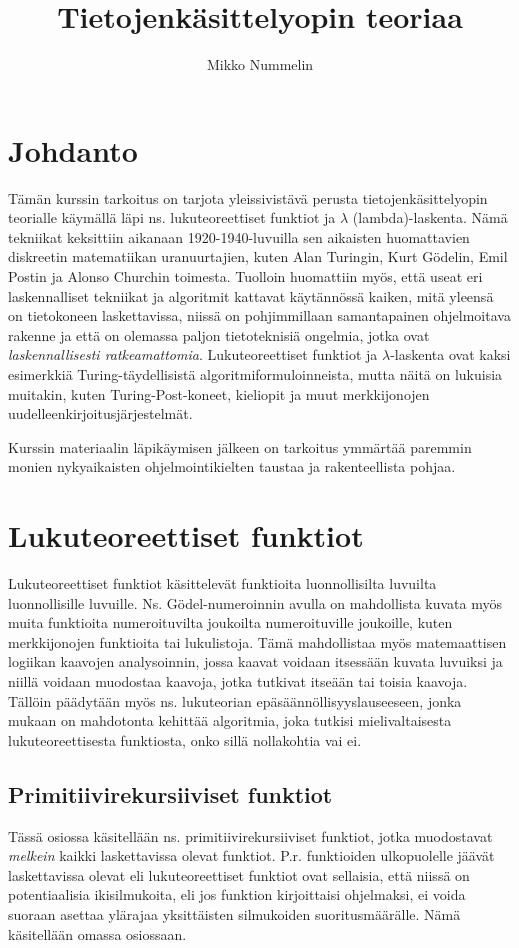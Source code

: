 \documentclass[a4paper]{article}
\begin{document}
\title{Tietojenkäsittelyopin teoriaa}
\author{Mikko Nummelin}
\maketitle
\tableofcontents

\section{Johdanto}
Tämän kurssin tarkoitus on tarjota yleissivistävä perusta tietojenkäsittelyopin
teorialle käymällä läpi ns. lukuteoreettiset funktiot ja $\lambda$ (lambda)-laskenta.
Nämä tekniikat keksittiin aikanaan 1920-1940-luvuilla sen aikaisten huomattavien
diskreetin matematiikan uranuurtajien, kuten Alan Turingin, Kurt Gödelin,
Emil Postin ja Alonso Churchin toimesta. Tuolloin huomattiin myös, että useat
eri laskennalliset tekniikat ja algoritmit kattavat käytännössä kaiken, mitä
yleensä on tietokoneen laskettavissa, niissä on pohjimmillaan samantapainen
ohjelmoitava rakenne ja että on olemassa paljon tietoteknisiä
ongelmia, jotka ovat \emph{laskennallisesti ratkeamattomia}. Lukuteoreettiset
funktiot ja $\lambda$-laskenta ovat kaksi esimerkkiä Turing-täydellisistä
algoritmiformuloinneista, mutta näitä on lukuisia muitakin, kuten
Turing-Post-koneet, kieliopit ja muut merkkijonojen
uudelleenkirjoitusjärjestelmät.

Kurssin materiaalin läpikäymisen jälkeen on tarkoitus ymmärtää paremmin
monien nykyaikaisten ohjelmointikielten taustaa ja rakenteellista pohjaa.

\section{Lukuteoreettiset funktiot}
Lukuteoreettiset funktiot käsittelevät funktioita luonnollisilta luvuilta
luonnollisille luvuille. Ns. Gödel-numeroinnin avulla on mahdollista kuvata
myös muita funktioita numeroituvilta joukoilta numeroituville joukoille, kuten
merkkijonojen funktioita tai lukulistoja. Tämä mahdollistaa myös matemaattisen
logiikan kaavojen analysoinnin, jossa kaavat voidaan itsessään kuvata luvuiksi
ja niillä voidaan muodostaa kaavoja, jotka tutkivat itseään tai toisia kaavoja.
Tällöin päädytään myös ns. lukuteorian epäsäännöllisyyslauseeseen, jonka
mukaan on mahdotonta kehittää algoritmia, joka tutkisi mielivaltaisesta
lukuteoreettisesta funktiosta, onko sillä nollakohtia vai ei.

\subsection{Primitiivirekursiiviset funktiot}
Tässä osiossa käsitellään ns. primitiivirekursiiviset funktiot, jotka muodostavat
\emph{melkein} kaikki laskettavissa olevat funktiot. P.r. funktioiden
ulkopuolelle jäävät laskettavissa olevat eli lukuteoreettiset funktiot ovat
sellaisia, että niissä on potentiaalisia ikisilmukoita, eli jos funktion
kirjoittaisi ohjelmaksi, ei voida suoraan asettaa ylärajaa yksittäisten
silmukoiden suoritusmäärälle. Nämä käsitellään omassa osiossaan.
\end{document}
